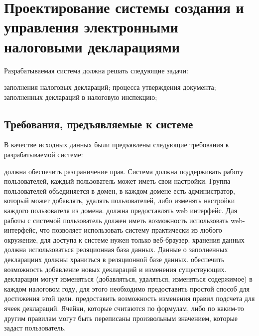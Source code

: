 \documentclass[14pt,a4paper]{reportmod}
\begin{document}
\chapter{Проектирование системы создания и управления электронными налоговыми декларациями}
Разрабатываемая система должна решать следующие задачи:
\begin{itemize}
   заполнения налоговых деклараций;
   процесса утверждения документа;
   заполненных деклараций в налоговую инспекцию;
\end{itemize}
\section{Требования, предъявляемые к системе}
В качестве исходных данных были предъявлены следующие требования к разрабатываемой системе:
\begin{enumerate}
   должна обеспечить разграничение прав. Система должна поддерживать работу пользователей, каждый пользователь может иметь свои настройки. Группа пользователей объединяется в домен, в каждом домене есть администратор, который может добавлять, удалять пользователей, либо изменять настройки каждого пользователя из домена.
   должна предоставлять web интерфейс. Для работы с системой пользователь должен иметь возможность использовать web-интерфейс, что позволяет использовать систему практически из любого окружение, для доступа к системе нужен только веб-браузер.
   хранения данных должна использоваться реляционная база данных. Данные о заполненных декларациих должны храниться в реляционной базе данных.
   обеспечить возможность добавление новых деклараций и изменения существующих. декларации могут изменяться (добавляться, удаляться, изменяться содержимое) в каждом налоговом году, для этого необходимо предоставить простой способ для достижения этой цели.
   предоставить возможность изменения правил подсчета для ячеек деклараций. Ячейки, которые считаются по формулам, либо по каким-то другим правилам могут быть переписаны произвольным значением, которые задаст пользователь.
\end{enumerate}
\end{document}
